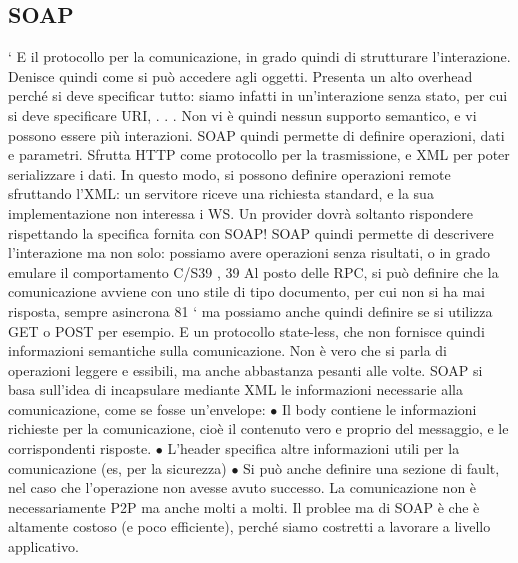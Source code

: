 \subsection{SOAP}
`
E il protocollo per la comunicazione, in grado quindi di strutturare l'interazione.
Denisce quindi come si può accedere agli oggetti. Presenta un alto overhead
perché si deve specificar tutto: siamo infatti in un'interazione senza stato, per
cui si deve specificare URI, . . . Non vi è quindi nessun supporto semantico, e vi
possono essere più interazioni.
SOAP quindi permette di definire operazioni, dati e parametri. Sfrutta
HTTP come protocollo per la trasmissione, e XML per poter serializzare i dati.
In questo modo, si possono definire operazioni remote sfruttando l'XML: un
servitore riceve una richiesta standard, e la sua implementazione non interessa i
WS. Un provider dovrà soltanto rispondere rispettando la specifica fornita con
SOAP!
SOAP quindi permette di descrivere l'interazione ma non solo: possiamo
avere operazioni senza risultati, o in grado emulare il comportamento C/S39 ,
39 Al posto delle RPC, si può definire che la comunicazione avviene con uno stile di tipo
documento, per cui non si ha mai risposta, sempre asincrona
81
`
ma possiamo anche quindi definire se si utilizza GET o POST per esempio. E
un protocollo state-less, che non fornisce quindi informazioni semantiche sulla
comunicazione. Non è vero che si parla di operazioni leggere e essibili, ma
anche abbastanza pesanti alle volte.
SOAP si basa sull'idea di incapsulare mediante XML le informazioni necessarie alla comunicazione, come se fosse
un'envelope:
$\bullet$ Il body contiene le informazioni richieste per la comunicazione, cioè il
contenuto vero e proprio del messaggio, e le corrispondenti risposte.
$\bullet$ L'header specifica altre informazioni utili per la comunicazione (es, per la
sicurezza)
$\bullet$ Si può anche definire una sezione di fault, nel caso che l'operazione non
avesse avuto successo.
La comunicazione non è necessariamente P2P ma anche molti a molti. Il problee
ma di SOAP è che è altamente costoso (e poco efficiente), perché siamo costretti
a lavorare a livello applicativo.
